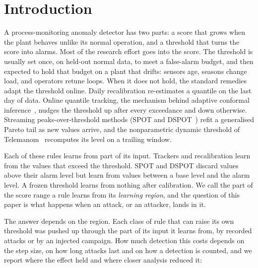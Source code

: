 \documentclass[sigconf]{acmart}
\begin{document}

\maketitle
{}

\section{Introduction}

A process-monitoring anomaly detector has two parts: a score that grows when the plant behaves
unlike its normal operation, and a threshold that turns the score into alarms. Most of the
research effort goes into the score. The threshold is usually set once, on held-out normal data,
to meet a false-alarm budget, and then expected to hold that budget on a plant that drifts:
sensors age, seasons change load, and operators retune loops. When it does not hold, the standard
remedies adapt the threshold online. Daily recalibration re-estimates a quantile on the last day
of data. Online quantile tracking, the mechanism behind adaptive conformal
inference~\cite{gibbs2021aci}, nudges the threshold up after every exceedance and down otherwise.
Streaming peaks-over-threshold methods (SPOT and DSPOT~\cite{siffer2017spot}) refit a generalised
Pareto tail as new values arrive, and the nonparametric dynamic threshold of
Telemanom~\cite{hundman2018telemanom} recomputes its level on a trailing window.

Each of these rules learns from part of its input. Trackers and recalibration learn from the
values that exceed the threshold. SPOT and DSPOT discard values above their alarm level but learn
from values between a base level and the alarm level. A frozen threshold learns from nothing after
calibration. We call the part of the score range a rule learns from its \emph{learning region},
and the question of this paper is what happens when an attack, or an attacker, lands in it.

The answer depends on the region. Each class of rule that can raise its own threshold was pushed up
through the part of its input it learns from, by recorded attacks or by an injected campaign. How much
detection this costs depends on the step size, on how long attacks last and on how a detection is
counted, and we report where the effect held and where closer analysis reduced it:
\end{document}
